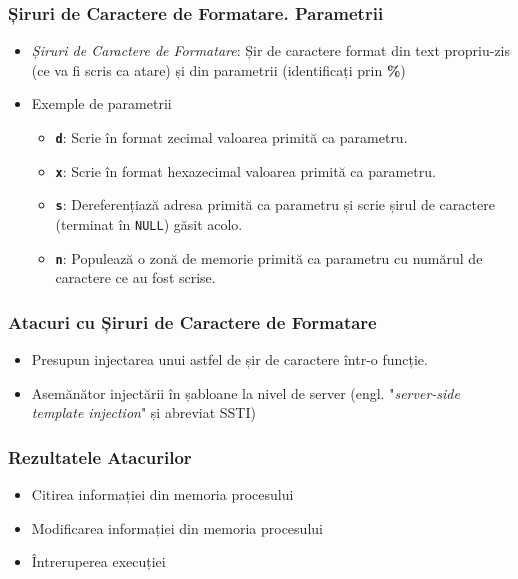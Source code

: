 \documentclass[xcolor={table}]{beamer}
\begin{document}
	\begin{frame}
		\frametitle{Șiruri de Caractere de Formatare. Parametrii}\pause
		\begin{itemize}[<+->]
		    \item \textit{Șiruri de Caractere de Formatare}: Șir de caractere format din text propriu-zis (ce va fi scris ca atare) și din parametrii (identificați prin \textbf{\%})
		    \item Exemple de parametrii
    	        \begin{itemize}
    		        \item \textbf{\texttt{d}}: Scrie în format zecimal valoarea primită ca parametru.
    		        \item \textbf{\texttt{x}}: Scrie în format hexazecimal valoarea primită ca parametru.
    		        \item \textbf{\texttt{s}}: Dereferențiază adresa primită ca parametru și scrie șirul de caractere (terminat în \texttt{NULL}) găsit acolo.
    		        \item \textbf{\texttt{n}}: Populează o zonă de memorie primită ca parametru cu numărul de caractere ce au fost scrise.
    		    \end{itemize}
		\end{itemize}
	\end{frame}
	
	\begin{frame}
		\frametitle{Atacuri cu Șiruri de Caractere de Formatare}\pause
		\begin{itemize}[<+->]
		    \item Presupun injectarea unui astfel de șir de caractere într-o funcție.
		    \item Asemănător injectării în șabloane la nivel de server (engl. "\textit{server-side template injection}" și abreviat SSTI)
		\end{itemize}
	\end{frame}
	
	\begin{frame}
		\frametitle{Rezultatele Atacurilor}\pause
		\begin{itemize}[<+->]
		    \item Citirea informației din memoria procesului
			\item Modificarea informației din memoria procesului
			\item Întreruperea execuției
		\end{itemize}
	\end{frame}
	
\end{document}
